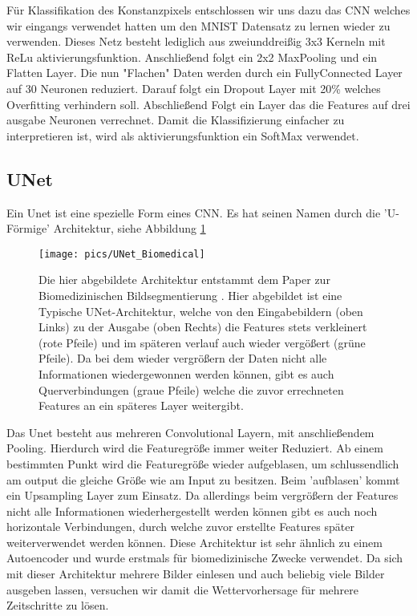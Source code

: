 Für Klassifikation des Konstanzpixels entschlossen wir uns dazu das CNN welches wir eingangs verwendet hatten um den MNIST Datensatz zu lernen wieder zu verwenden. Dieses Netz besteht lediglich aus zweiunddreißig 3x3 Kerneln mit ReLu aktivierungsfunktion. Anschließend folgt ein 2x2 MaxPooling und ein Flatten Layer. Die nun "Flachen" Daten werden durch ein FullyConnected Layer auf 30 Neuronen reduziert. Darauf folgt ein Dropout Layer mit 20\% welches Overfitting verhindern soll. Abschließend Folgt ein Layer das die Features auf drei ausgabe Neuronen verrechnet. Damit die Klassifizierung einfacher zu interpretieren ist, wird als aktivierungsfunktion ein SoftMax verwendet.

\subsection{UNet}
\label{kapitelUNet}
Ein Unet ist eine spezielle Form eines CNN. Es hat seinen Namen durch die 'U-Förmige' Architektur, siehe Abbildung \ref{imgUNetA}
\begin{figure}[h]
	\centering
	\texttt{[image: pics/UNet\_Biomedical]}
	\caption[UNet aus Paper von O. Ronneberger, P. Fischer und T. Brox]{Die hier abgebildete Architektur entstammt dem Paper zur Biomedizinischen Bildsegmentierung \cite{DBLP:journals/corr/RonnebergerFB15}. Hier abgebildet ist eine Typische UNet-Architektur, welche von den Eingabebildern (oben Links) zu der Ausgabe (oben Rechts) die Features stets verkleinert (rote Pfeile) und im späteren verlauf auch wieder vergößert (grüne Pfeile). Da bei dem wieder vergrößern der Daten nicht alle Informationen wiedergewonnen werden können, gibt es auch Querverbindungen (graue Pfeile) welche die zuvor errechneten Features an ein späteres Layer weitergibt.}
	\label{imgUNetA}
\end{figure}

Das Unet besteht aus mehreren Convolutional Layern, mit anschließendem Pooling. Hierdurch wird die Featuregröße immer weiter Reduziert. Ab einem bestimmten Punkt wird die Featuregröße wieder aufgeblasen, um schlussendlich am output die gleiche Größe wie am Input zu besitzen. Beim 'aufblasen' kommt ein Upsampling Layer zum Einsatz. Da allerdings beim vergrößern der Features nicht alle Informationen wiederhergestellt werden können gibt es auch noch horizontale Verbindungen, durch welche zuvor erstellte Features später weiterverwendet werden können.
Diese Architektur ist sehr ähnlich zu einem Autoencoder und wurde erstmals für biomedizinische Zwecke verwendet. Da sich mit dieser Architektur mehrere Bilder einlesen und auch beliebig viele Bilder ausgeben lassen, versuchen wir damit die Wettervorhersage für mehrere Zeitschritte zu lösen.

